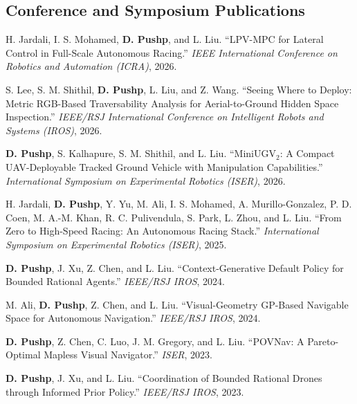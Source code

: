 \documentclass[11pt,letterpaper]{article}
\newcommand{\me}{\textbf{D. Pushp}}
\begin{document}
\subsection{Conference and Symposium Publications}
\begin{enumerate}[label={[C\arabic*]}]
\item H. Jardali, I. S. Mohamed, \me, and L. Liu. ``LPV-MPC for Lateral Control in Full-Scale Autonomous Racing.'' \emph{IEEE International Conference on Robotics and Automation (ICRA)}, 2026.
\item S. Lee, S. M. Shithil, \me, L. Liu, and Z. Wang. ``Seeing Where to Deploy: Metric RGB-Based Traversability Analysis for Aerial-to-Ground Hidden Space Inspection.'' \emph{IEEE/RSJ International Conference on Intelligent Robots and Systems (IROS)}, 2026.
\item \me, S. Kalhapure, S. M. Shithil, and L. Liu. ``MiniUGV$_2$: A Compact UAV-Deployable Tracked Ground Vehicle with Manipulation Capabilities.'' \emph{International Symposium on Experimental Robotics (ISER)}, 2026.
\item H. Jardali, \me, Y. Yu, M. Ali, I. S. Mohamed, A. Murillo-Gonzalez, P. D. Coen, M. A.-M. Khan, R. C. Pulivendula, S. Park, L. Zhou, and L. Liu. ``From Zero to High-Speed Racing: An Autonomous Racing Stack.'' \emph{International Symposium on Experimental Robotics (ISER)}, 2025.
\item \me, J. Xu, Z. Chen, and L. Liu. ``Context-Generative Default Policy for Bounded Rational Agents.'' \emph{IEEE/RSJ IROS}, 2024.
\item M. Ali, \me, Z. Chen, and L. Liu. ``Visual-Geometry GP-Based Navigable Space for Autonomous Navigation.'' \emph{IEEE/RSJ IROS}, 2024.
\item \me, Z. Chen, C. Luo, J. M. Gregory, and L. Liu. ``POVNav: A Pareto-Optimal Mapless Visual Navigator.'' \emph{ISER}, 2023.
\item \me, J. Xu, and L. Liu. ``Coordination of Bounded Rational Drones through Informed Prior Policy.'' \emph{IEEE/RSJ IROS}, 2023.
\end{enumerate}

\newpage
\end{document}

